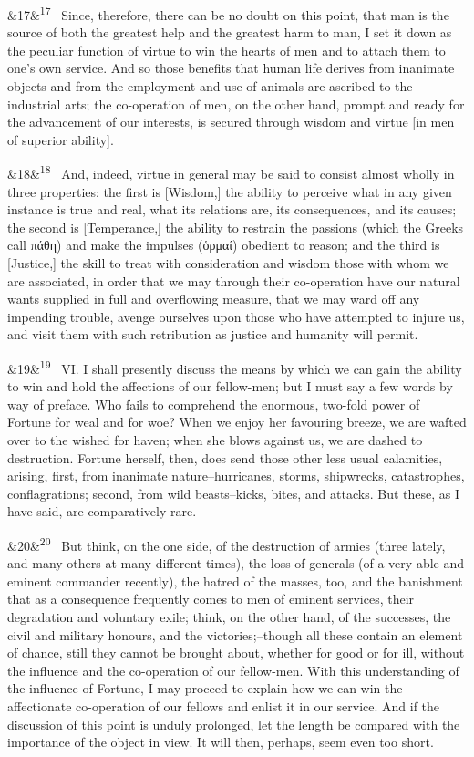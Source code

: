 \documentclass[12pt]{article}
\newcommand{\para}[1][]{\par\noindent\ifx&#1&\else\textsuperscript{\footnotesize #1}~\fi}
\begin{document}
\para[17] Since, therefore, there can be no doubt on this point, that man is the source of both the greatest help and the greatest harm to man, I set it down as the peculiar function of virtue to win the hearts of men and to attach them to one's own service. And so those benefits that human life derives from inanimate objects and from the employment and use of animals are ascribed to the industrial arts; the co-operation of men, on the other hand, prompt and ready for the advancement of our interests, is secured through wisdom and virtue [in men of superior ability].

\para[18] And, indeed, virtue in general may be said to consist almost wholly in three properties: the first is [Wisdom,] the ability to perceive what in any given instance is true and real, what its relations are, its consequences, and its causes; the second is [Temperance,] the ability to restrain the passions (which the Greeks call πάθη) and make the impulses (ὁρμαί) obedient to reason; and the third is [Justice,] the skill to treat with consideration and wisdom those with whom we are associated, in order that we may through their co-operation have our natural wants supplied in full and overflowing measure, that we may ward off any impending trouble, avenge ourselves upon those who have attempted to injure us, and visit them with such retribution as justice and humanity will permit.

\para[19] VI. I shall presently discuss the means by which we can gain the ability to win and hold the affections of our fellow-men; but I must say a few words by way of preface. Who fails to comprehend the enormous, two-fold power of Fortune for weal and for woe? When we enjoy her favouring breeze, we are wafted over to the wished for haven; when she blows against us, we are dashed to destruction. Fortune herself, then, does send those other less usual calamities, arising, first, from inanimate nature--hurricanes, storms, shipwrecks, catastrophes, conflagrations; second, from wild beasts--kicks, bites, and attacks. But these, as I have said, are comparatively rare.

\para[20] But think, on the one side, of the destruction of armies (three lately, and many others at many different times), the loss of generals (of a very able and eminent commander recently), the hatred of the masses, too, and the banishment that as a consequence frequently comes to men of eminent services, their degradation and voluntary exile; think, on the other hand, of the successes, the civil and military honours, and the victories;--though all these contain an element of chance, still they cannot be brought about, whether for good or for ill, without the influence and the co-operation of our fellow-men. With this understanding of the influence of Fortune, I may proceed to explain how we can win the affectionate co-operation of our fellows and enlist it in our service. And if the discussion of this point is unduly prolonged, let the length be compared with the importance of the object in view. It will then, perhaps, seem even too short.
\end{document}
